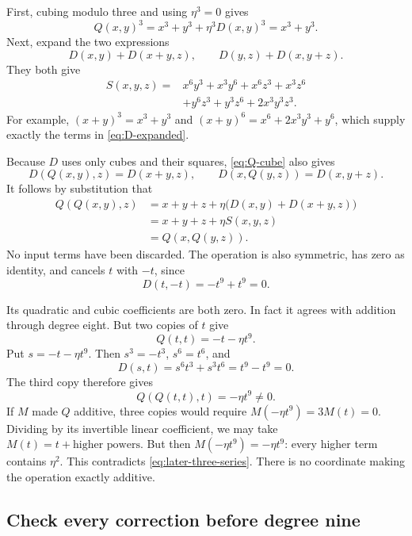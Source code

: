 First, cubing modulo three and using \(\eta^3=0\) gives
\begin{equation}\label{eq:Q-cube}
 Q(x,y)^3=x^3+y^3+\eta^3D(x,y)^3=x^3+y^3.
\end{equation}
Next, expand the two expressions
\[
 D(x,y)+D(x+y,z),\qquad D(y,z)+D(x,y+z).
\]
They both give
\begin{equation}\label{eq:D-expanded}
 \begin{split}
 S(x,y,z)={}&x^6y^3+x^3y^6+x^6z^3+x^3z^6\\
 &+y^6z^3+y^3z^6+2x^3y^3z^3.
 \end{split}
\end{equation}
For example, \((x+y)^3=x^3+y^3\) and \((x+y)^6=x^6+2x^3y^3+y^6\), which supply exactly the terms in \eqref{eq:D-expanded}.

Because \(D\) uses only cubes and their squares, \eqref{eq:Q-cube} also gives
\[
 D(Q(x,y),z)=D(x+y,z),\qquad
 D(x,Q(y,z))=D(x,y+z).
\]
It follows by substitution that
\begin{align*}
 Q(Q(x,y),z)
 &=x+y+z+\eta\bigl(D(x,y)+D(x+y,z)\bigr)\\
 &=x+y+z+\eta S(x,y,z)\\
 &=Q(x,Q(y,z)).
\end{align*}
No input terms have been discarded. The operation is also symmetric, has zero as identity, and cancels \(t\) with \(-t\), since
\[
 D(t,-t)=-t^9+t^9=0.
\]

Its quadratic and cubic coefficients are both zero. In fact it agrees with addition through degree eight. But two copies of \(t\) give
\[
 Q(t,t)=-t-\eta t^9.
\]
Put \(s=-t-\eta t^9\). Then \(s^3=-t^3\), \(s^6=t^6\), and
\[
 D(s,t)=s^6t^3+s^3t^6=t^9-t^9=0.
\]
The third copy therefore gives
\begin{equation}\label{eq:later-three-series}
 \boxed{\;Q(Q(t,t),t)=-\eta t^9\ne0.\;}
\end{equation}
If \(M\) made \(Q\) additive, three copies would require \(M(-\eta t^9)=3M(t)=0\). Dividing by its invertible linear coefficient, we may take \(M(t)=t+\text{higher powers}\). But then \(M(-\eta t^9)=-\eta t^9\): every higher term contains \(\eta^2\). This contradicts \eqref{eq:later-three-series}. There is no coordinate making the operation exactly additive.

\subsection{Check every correction before degree nine}

